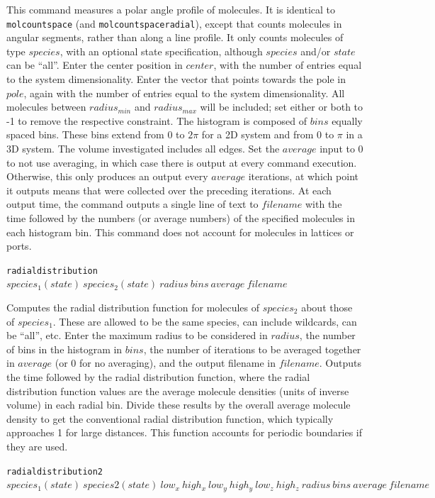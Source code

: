 \documentclass {book}
\newcommand {\ttt} {\texttt}
\begin{document}
\begin{description}
This command measures a polar angle profile of molecules. It is identical to \ttt{molcountspace} (and \ttt{molcountspaceradial}), except that counts molecules in angular segments, rather than along a line profile. It only counts molecules of type $species$, with an optional state specification, although $species$ and/or $state$ can be ``all''. Enter the center position in $center$, with the number of entries equal to the system dimensionality. Enter the vector that points towards the pole in $pole$, again with the number of entries equal to the system dimensionality. All molecules between $radius_{min}$ and $radius_{max}$ will be included; set either or both to -1 to remove the respective constraint. The histogram is composed of $bins$ equally spaced bins. These bins extend from 0 to $2\pi$ for a 2D system and from 0 to $\pi$ in a 3D system. The volume investigated includes all edges. Set the $average$ input to 0 to not use averaging, in which case there is output at every command execution. Otherwise, this only produces an output every $average$ iterations, at which point it outputs means that were collected over the preceding iterations. At each output time, the command outputs a single line of text to $filename$ with the time followed by the numbers (or average numbers) of the specified molecules in each histogram bin. This command does not account for molecules in lattices or ports.

\item{\ttt{radialdistribution} $species_1(state)\ species_2(state)\ radius\ bins\ average\ filename$}

Computes the radial distribution function for molecules of $species_2$ about those of $species_1$. These are allowed to be the same species, can include wildcards, can be ``all'', etc. Enter the maximum radius to be considered in $radius$, the number of bins in the histogram in $bins$, the number of iterations to be averaged together in $average$ (or 0 for no averaging), and the output filename in $filename$. Outputs the time followed by the radial distribution function, where the radial distribution function values are the average molecule densities (units of inverse volume) in each radial bin. Divide these results by the overall average molecule density to get the conventional radial distribution function, which typically approaches 1 for large distances. This function accounts for periodic boundaries if they are used.

\item{\ttt{radialdistribution2} $species_1(state)\ species2(state)\ low_x\ high_x\ low_y\ high_y\ low_z\ high_z\ radius\ bins\ average\ filename$}


\end{description}
\end{document}
